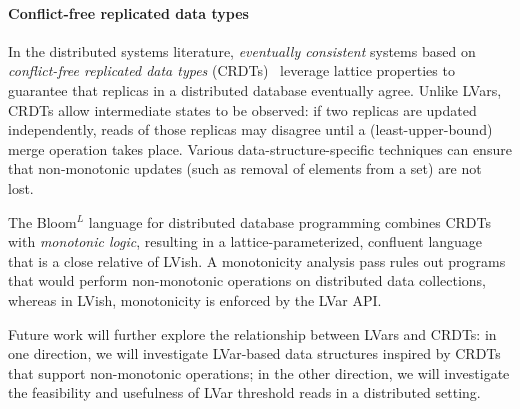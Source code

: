 
\paragraph{Conflict-free replicated data types}

In the distributed systems literature, \emph{eventually consistent}
systems based on \emph{conflict-free replicated data types}
(CRDTs)~\cite{crdts} leverage lattice properties to guarantee that
replicas in a distributed database eventually agree.  Unlike LVars,
CRDTs allow intermediate states to be observed: if two replicas are
updated independently, reads of those replicas may disagree until a
(least-upper-bound) merge operation takes place.  Various
data-structure-specific techniques can ensure that non-monotonic
updates (such as removal of elements from a set) are not lost.

The Bloom$^L$ language for distributed database programming
\cite{blooml} combines CRDTs with \emph{monotonic logic}, resulting in a
lattice-parameterized, confluent language that is a close relative of
LVish.  A monotonicity analysis pass rules out programs
that would perform non-monotonic operations on distributed data
collections, whereas in LVish, monotonicity is enforced by the LVar
API.

Future work will further explore the relationship between LVars and
CRDTs: in one direction, we will investigate LVar-based data
structures inspired by CRDTs that support non-monotonic operations; in
the other direction, we will investigate the feasibility and
usefulness of LVar threshold reads in a distributed setting.



